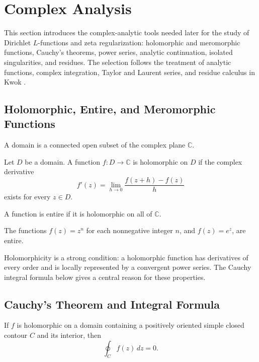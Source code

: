 \section{Complex Analysis}

This section introduces the complex-analytic tools needed later for the study of Dirichlet $L$-functions and zeta regularization: holomorphic and meromorphic functions, Cauchy's theorems, power series, analytic continuation, isolated singularities, and residues. The selection follows the treatment of analytic functions, complex integration, Taylor and Laurent series, and residue calculus in Kwok \cite[Chapters 2, 4--6]{Kwok2010}.

\subsection{Holomorphic, Entire, and Meromorphic Functions}

\begin{definition}[Domain]
A domain is a connected open subset of the complex plane $\mathbb{C}$.
\end{definition}

\begin{definition}
Let $D$ be a domain. A function $f:D\to\mathbb{C}$ is holomorphic on $D$ if the complex derivative
\[
 f'(z)=\lim_{h\to 0}\frac{f(z+h)-f(z)}{h}
\]
exists for every $z\in D$.
\end{definition}

\begin{definition}
A function is entire if it is holomorphic on all of $\mathbb{C}$.
\end{definition}

\begin{example}
The functions $f(z)=z^n$ for each nonnegative integer $n$, and $f(z)=e^z$, are entire.
\end{example}

Holomorphicity is a strong condition: a holomorphic function has derivatives of every order and is locally represented by a convergent power series. The Cauchy integral formula below gives a central reason for these properties.

\subsection{Cauchy's Theorem and Integral Formula}

\begin{theorem}
If $f$ is holomorphic on a domain containing a positively oriented simple closed contour $C$ and its interior, then
\[
 \oint_C f(z)\,dz=0.
\]
\end{theorem}

